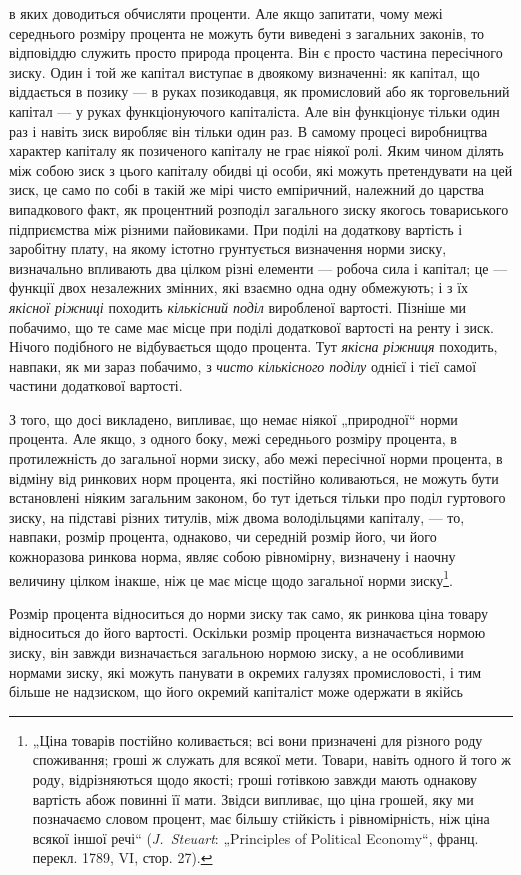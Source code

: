 \parcont{}  %
в яких доводиться обчисляти проценти. Але якщо запитати, чому
межі середнього розміру процента не можуть бути виведені
з загальних законів, то відповіддю служить просто природа процента.
Він є просто частина пересічного зиску. Один і той же
капітал виступає в двоякому визначенні: як капітал, що віддається
в позику — в руках позикодавця, як промисловий або як
торговельний капітал — у руках функціонуючого капіталіста. Але
він функціонує тільки один раз і навіть зиск виробляє він тільки
один раз. В самому процесі виробництва характер капіталу як
позиченого капіталу не грає ніякої ролі. Яким чином ділять
між собою зиск з цього капіталу обидві ці особи, які можуть
претендувати на цей зиск, це само по собі в такій же мірі чисто
емпіричний, належний до царства випадкового факт, як процентний
розподіл загального зиску якогось товариського підприємства
між різними пайовиками. При поділі на додаткову вартість
і заробітну плату, на якому істотно грунтується визначення
норми зиску, визначально впливають два цілком різні елементи —
робоча сила і капітал; це — функції двох незалежних змінних, які
взаємно одна одну обмежують; і з їх \emph{якісної ріжниці} походить
\emph{кількісний поділ }виробленої вартості. Пізніше ми побачимо, що
те саме має місце при поділі додаткової вартості на ренту і зиск.
Нічого подібного не відбувається щодо процента. Тут \emph{якісна}
\emph{ріжниця} походить, навпаки, як ми зараз побачимо, з \emph{чисто кількісного
поділу} однієї і тієї самої частини додаткової вартості.

З того, що досі викладено, випливає, що немає ніякої „природної“
норми процента. Але якщо, з одного боку, межі середнього
розміру процента, в протилежність до загальної норми зиску,
або межі пересічної норми процента, в відміну від ринкових
норм процента, які постійно коливаються, не можуть бути встановлені
ніяким загальним законом, бо тут ідеться тільки про
поділ гуртового зиску, на підставі різних титулів, між двома володільцями
капіталу, — то, навпаки, розмір процента, однаково,
чи середній розмір його, чи його кожноразова ринкова норма,
являє собою рівномірну, визначену і наочну величину цілком
інакше, ніж це має місце щодо загальної норми зиску\footnote{
„Ціна товарів постійно коливається; всі вони призначені для різного роду
споживання; гроші ж служать для всякої мети. Товари, навіть одного й того ж
роду, відрізняються щодо якості; гроші готівкою завжди мають однакову вартість
абож повинні її мати. Звідси випливає, що ціна грошей, яку ми позначаємо
словом процент, має більшу стійкість і рівномірність, ніж ціна всякої
іншої речі“ (\emph{J.~Steuart}: „Principles of Political Economy“, франц. перекл. 1789,
VI, стор. 27).
}.

Розмір процента відноситься до норми зиску так само, як ринкова
ціна товару відноситься до його вартості. Оскільки розмір
процента визначається нормою зиску, він завжди визначається
загальною нормою зиску, а не особливими нормами зиску, які
можуть панувати в окремих галузях промисловості, і тим більше
не надзиском, що його окремий капіталіст може одержати в якійсь
\parbreak{}  %
